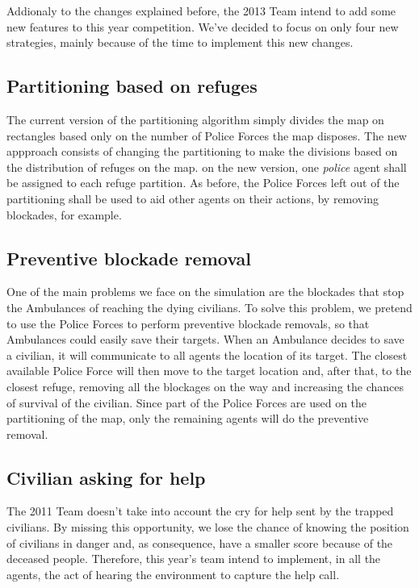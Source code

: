 Addionaly to the changes explained before, the 2013 Team intend to add some new features to this year competition. We've decided to focus on only four new strategies, mainly because of the time to implement this new changes.


\subsection{Partitioning based on refuges}
	\label{subsec:partition}

The current version of the partitioning algorithm simply divides the map on rectangles based only on the number of Police Forces the map disposes. The new appproach consists of changing the partitioning to make the divisions based on the distribution of refuges on the map. on the new version, one {\it police} agent shall be assigned to each refuge partition. As before, the Police Forces left out of the partitioning shall be used to aid other agents on their actions, by removing blockades, for example.

\subsection{Preventive blockade removal}
	\label{subsec:preventive}

One of the main problems we face on the simulation are the blockades that stop the Ambulances of reaching the dying civilians. To solve this problem, we pretend to use the Police Forces to perform preventive blockade removals, so that Ambulances could easily save their targets. When an Ambulance decides to save a civilian, it will communicate to all agents the location of its target. The closest available Police Force will then move to the target location and, after that, to the closest refuge, removing all the blockages on the way and increasing the chances of survival of the civilian. Since part of the Police Forces are used on the partitioning of the map, only the remaining agents will do the preventive removal.

\subsection{Civilian asking for help}
	\label{subsec:help}
	
The 2011 Team doesn't take into account the cry for help sent by the trapped civilians. By missing this opportunity, we lose the chance of knowing the position of civilians in danger and, as consequence, have a smaller score because of the deceased people. Therefore, this year's team intend to implement, in all the agents, the act of hearing the environment to capture the help call.

